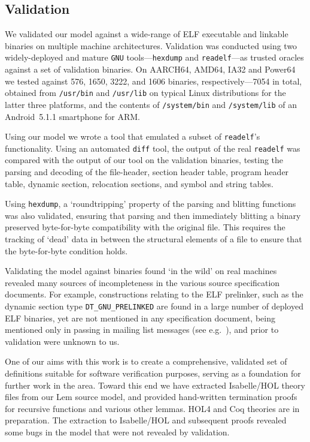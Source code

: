 \subsection{Validation}
\label{subsect.elf.validation}

We validated our model against a wide-range of ELF executable and linkable binaries on multiple machine architectures.
Validation was conducted using two widely-deployed and mature \texttt{GNU} tools---\texttt{hexdump} and \texttt{readelf}---as trusted oracles against a set of validation binaries.
On AARCH64, AMD64, IA32 and Power64 we tested against 576, 1650, 3222, and 1606 binaries, respectively---7054 in total, obtained from \texttt{/usr/bin} and \texttt{/usr/lib} on typical Linux distributions for the latter three platforms, and the contents of \texttt{/system/bin} and \texttt{/system/lib} of an Android~5.1.1 smartphone for ARM.

Using our model we wrote a tool that emulated a subset of \texttt{readelf}'s functionality.
Using an automated \texttt{diff} tool, the output of the real \texttt{readelf} was compared with the output of our tool on the validation binaries, testing the parsing and decoding of the file-header, section header table, program header table, dynamic section, relocation sections, and symbol and string tables.

Using \texttt{hexdump}, a `roundtripping' property of the parsing and blitting functions was also validated, ensuring that parsing and then immediately blitting a binary preserved byte-for-byte compatibility with the original file.
This requires the tracking of `dead' data in between the structural elements of a file to ensure that the byte-for-byte condition holds.

Validating the model against binaries found `in the wild' on real machines revealed many sources of incompleteness in the various source specification documents.
For example, constructions relating to the ELF prelinker, such as the dynamic section type \texttt{DT\_GNU\_PRELINKED} are found in a large number of deployed ELF binaries, yet are not mentioned in any specification document, being mentioned only in passing in mailing list messages (see e.g.~\cite{jelinek-prelinker-2001}), and prior to validation were unknown to us.

One of our aims with this work is to create a comprehensive, validated set of definitions suitable for software verification purposes, serving as a foundation for further work in the area.
Toward this end we have extracted Isabelle/HOL theory files from our Lem source model, and provided hand-written termination proofs for recursive functions and various other lemmas.
HOL4 and Coq theories are in preparation.
The extraction to Isabelle/HOL and subsequent proofs revealed some bugs in the model that were not revealed by validation.

